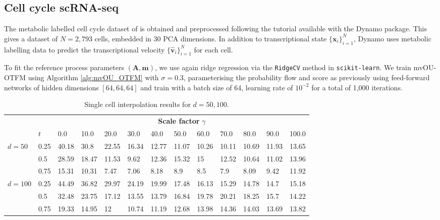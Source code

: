\documentclass{article}
\theoremstyle{newstyle}
\begin{document}
\subsection{Cell cycle scRNA-seq}
The metabolic labelled cell cycle dataset of \cite{battich2020sequencing} is obtained and preprocessed following the tutorial available with the Dynamo \cite{qiu2022mapping} package. This gives a dataset of $N = 2,793$ cells, embedded in 30 PCA dimensions. In addition to transcriptional state $\{ \bm{x}_i \}_{i = 1}^N$, Dynamo uses metabolic labelling data to predict the transcriptional velocity $\{ \hat{\bm{v}}_i \}_{i = 1}^N$ for each cell. 

To fit the reference process parameters $(\bm{A}, \bm{m})$, we use again ridge regression via the \texttt{RidgeCV} method in \texttt{scikit-learn}. 
We train mvOU-OTFM using Algorithm \ref{alg:mvOU_OTFM} with $\sigma = 0.3$, parameterising the probability flow and score as previously using feed-forward networks of hidden dimensions $[64, 64, 64]$ and train with a batch size of 64, learning rate of $10^{-2}$ for a total of 1,000 iterations.

\begin{table}[h]
  \small
  \centering
  \setlength{\tabcolsep}{3pt}
  \begin{tabular}{lllllllllllll}
    & & \multicolumn{11}{c}{\textbf{Scale factor} $\gamma$} \\ 
 &   $t$ &   0.0 &   10.0 &   20.0 &   30.0 &   40.0 &   50.0 &   60.0 &   70.0 &   80.0 &   90.0 &   100.0 \\
\midrule  
\multirow{3}{*}{$d = 50$}  & 0.25 & 40.18 &  30.8  &  22.55 &  16.34 &  12.77 &  11.07 &  10.26 &  10.11 &  10.69 &  11.93 &   13.65 \\ 
 &   0.5 & 28.59 &  18.47 &  11.53 &   9.62 &  12.36 &  15.32 &  15    &  12.52 &  10.64 &  11.02 &   13.96 \\ 
 &   0.75 & 15.31 &  10.31 &   7.47 &   7.06 &   8.18 &   8.9  &   8.5  &   7.9  &   8.09 &   9.42 &   11.92 \\
\midrule  
\multirow{3}{*}{$d = 100$} &   0.25 & 44.49 &  36.82 &  29.97 &  24.19 &  19.99 &  17.48 &  16.13 &  15.29 &  14.78 &  14.7  &   15.18 \\ 
&   0.5 & 32.48 &  23.75 &  17.12 &  13.55 &  13.79 &  16.84 &  19.78 &  20.21 &  18.25 &  15.7  &   14.22 \\
&   0.75 & 19.33 &  14.95 &  12    &  10.74 &  11.19 &  12.68 &  13.98 &  14.36 &  14.03 &  13.69 &   13.82 \\
\midrule  
  \end{tabular}
  \caption{Single cell interpolation results for $d = 50, 100$.}
  \label{tab:cell_cycle_results_extra}
\end{table}
\end{document}

